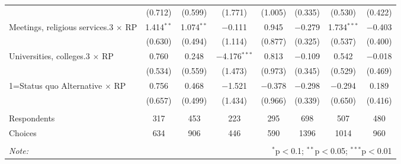 \begin{table}[!htbp]
\begin{tabular}{@{\extracolsep{5pt}}lccccccc}
  & (0.712) & (0.599) & (1.771) & (1.005) & (0.335) & (0.530) & (0.422) \\ 
  Meetings, religious services.3 $\times$ RP & 1.414$^{**}$ & 1.074$^{**}$ & $-$0.111 & 0.945 & $-$0.279 & 1.734$^{***}$ & $-$0.403 \\ 
  & (0.630) & (0.494) & (1.114) & (0.877) & (0.325) & (0.537) & (0.400) \\ 
  Universities, colleges.3 $\times$ RP & 0.760 & 0.248 & $-$4.176$^{***}$ & 0.813 & $-$0.109 & 0.542 & $-$0.018 \\ 
  & (0.534) & (0.559) & (1.473) & (0.973) & (0.345) & (0.529) & (0.469) \\ 
  1=Status quo Alternative $\times$ RP & 0.756 & 0.468 & $-$1.521 & $-$0.378 & $-$0.298 & $-$0.294 & 0.189 \\ 
  & (0.657) & (0.499) & (1.434) & (0.966) & (0.339) & (0.650) & (0.416) \\ 
 \hline \\[-1.8ex] 
Respondents & 317 & 453 & 223 & 295 & 698 & 507 & 480\\ 
 Choices & 634 & 906 & 446 & 590 & 1396 & 1014 & 960\\ 
\hline 
\hline \\[-1.8ex] 
\textit{Note:}  & \multicolumn{7}{r}{$^{*}$p$<$0.1; $^{**}$p$<$0.05; $^{***}$p$<$0.01} \\ 
\end{tabular} 
\end{table} 
